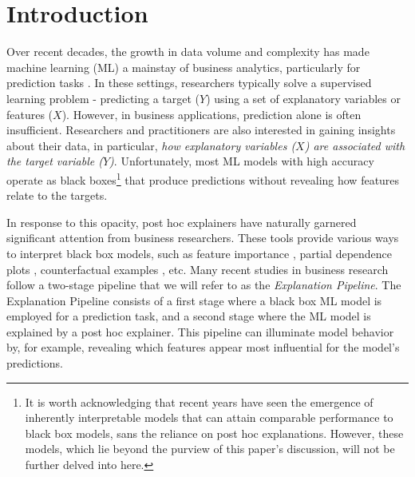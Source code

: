 \documentclass[11pt]{article}
\begin{document}



\section{Introduction}



Over recent decades, the growth in data volume and complexity has made machine learning (ML) a mainstay of business analytics, particularly for prediction tasks \citep{kleinberg2015prediction,mullainathan17applied}. In these settings, researchers typically solve a supervised learning problem - predicting a target ($Y$) using a set of explanatory variables or features ($X$). However, in business applications, prediction alone is often insufficient. Researchers and practitioners are also interested in gaining insights about their data, in particular, \textit{how explanatory variables ($X$) are associated with the target variable ($Y$)}. Unfortunately, most ML models with high accuracy operate as black boxes\footnote{It is worth acknowledging that recent years have seen the emergence of inherently interpretable models that can attain comparable performance to black box models, sans the reliance on post hoc explanations. However, these models, which lie beyond the purview of this paper's discussion, will not be further delved into here.} that produce predictions without revealing how features relate to the targets.



In response to this opacity, post hoc explainers have naturally garnered significant attention from business researchers. These tools provide various ways to interpret black box models, such as feature importance \citep{ribeiro16lime,lundberg17shap}, partial dependence plots \citep{friedman01pdp}, counterfactual examples \citep{mothilal20dice}, etc. Many recent studies in business research follow a two-stage pipeline that we will refer to as the \emph{Explanation Pipeline}. The Explanation Pipeline consists of a first stage where a black box ML model is employed for a prediction task, and a second stage where the ML model is explained by a post hoc explainer. This pipeline can illuminate model behavior by, for example, revealing which features appear most influential for the model’s predictions. 
\end{document}
